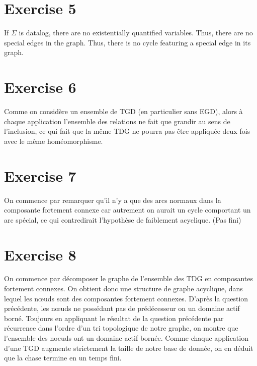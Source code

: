 \documentclass{cours}
\begin{document}
\section{Exercise 5}
If $\Sigma$ is datalog, there are no existentially quantified variables. Thus, there are no special edges in the graph. Thus, there is no cycle featuring a special edge in its graph.

\section{Exercise 6}
Comme on considère un ensemble de TGD (en particulier sans EGD), alors à chaque application l'ensemble des relations ne fait que grandir au sens de l'inclusion, ce qui fait que la même TDG ne pourra pas être appliquée deux fois avec le même homéomorphisme.
	
\section{Exercise 7}
On commence par remarquer qu'il n'y a que des arcs normaux dans la composante fortement connexe car autrement on aurait un cycle comportant un arc spécial, ce qui contredirait l'hypothèse de faiblement acyclique. (Pas fini)
	
\section{Exercise 8}
On commence par décomposer le graphe de l'ensemble des TDG en composantes fortement connexes. On obtient donc une structure de graphe acyclique, dans lequel les nœuds sont des composantes fortement connexes. D'après la question précédente, les nœuds ne possédant pas de prédécesseur on un domaine actif borné. Toujours en appliquant le résultat de la question précédente par récurrence dans l'ordre d'un tri topologique de notre graphe, on montre que l'ensemble des noeuds ont un domaine actif bornée. Comme chaque application d'une TGD augmente strictement la taille de notre base de donnée, on en déduit que la chase termine en un temps fini.
	
\end{document}

